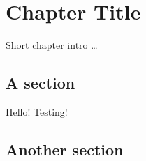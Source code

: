 \chapter{\label{cha:title}Chapter Title}

Short chapter intro \ldots

\section{A section}

Hello! Testing!



\section{Another section}



